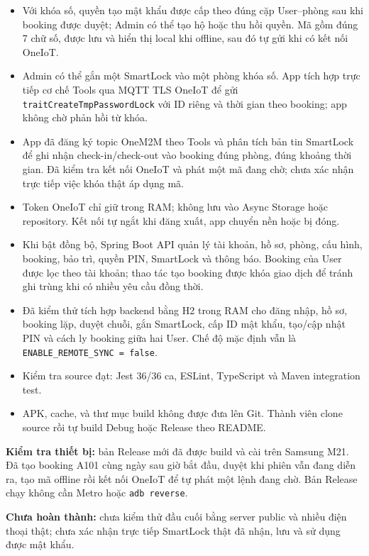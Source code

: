 \documentclass[12pt,a4paper]{article}
\begin{document}
\begin{itemize}[leftmargin=1.6em,itemsep=2pt,topsep=2pt]
  \item Với khóa số, quyền tạo mật khẩu được cấp theo đúng cặp User--phòng sau khi booking được duyệt; Admin có thể tạo hộ hoặc thu hồi quyền. Mã gồm đúng 7 chữ số, được lưu và hiển thị local khi offline, sau đó tự gửi khi có kết nối OneIoT.
  \item Admin có thể gắn một SmartLock vào một phòng khóa số. App tích hợp trực tiếp cơ chế Tools qua MQTT TLS OneIoT để gửi \texttt{traitCreateTmpPasswordLock} với ID riêng và thời gian theo booking; app không chờ phản hồi từ khóa.
  \item App đã đăng ký topic OneM2M theo Tools và phân tích bản tin SmartLock để ghi nhận check-in/check-out vào booking đúng phòng, đúng khoảng thời gian. Đã kiểm tra kết nối OneIoT và phát một mã đang chờ; chưa xác nhận trực tiếp việc khóa thật áp dụng mã.
  \item Token OneIoT chỉ giữ trong RAM; không lưu vào Async Storage hoặc repository. Kết nối tự ngắt khi đăng xuất, app chuyển nền hoặc bị đóng.
  \item Khi bật đồng bộ, Spring Boot API quản lý tài khoản, hồ sơ, phòng, cấu hình, booking, bảo trì, quyền PIN, SmartLock và thông báo. Booking của User được lọc theo tài khoản; thao tác tạo booking được khóa giao dịch để tránh ghi trùng khi có nhiều yêu cầu đồng thời.
  \item Đã kiểm thử tích hợp backend bằng H2 trong RAM cho đăng nhập, hồ sơ, booking lặp, duyệt chuỗi, gắn SmartLock, cấp ID mật khẩu, tạo/cập nhật PIN và cách ly booking giữa hai User. Chế độ mặc định vẫn là \texttt{ENABLE\_REMOTE\_SYNC = false}.
  \item Kiểm tra source đạt: Jest 36/36 ca, ESLint, TypeScript và Maven integration test.
  \item APK, cache,  và thư mục build không được đưa lên Git. Thành viên clone source rồi tự build Debug hoặc Release theo README.
\end{itemize}

\textbf{Kiểm tra thiết bị:} bản Release mới đã được build và cài trên Samsung M21. Đã tạo booking A101 cùng ngày sau giờ bắt đầu, duyệt khi phiên vẫn đang diễn ra, tạo mã offline rồi kết nối OneIoT để tự phát một lệnh đang chờ. Bản Release chạy không cần Metro hoặc \texttt{adb reverse}.

\textbf{Chưa hoàn thành:} chưa kiểm thử đầu cuối bằng server public và nhiều điện thoại thật; chưa xác nhận trực tiếp SmartLock thật đã nhận, lưu và sử dụng được mật khẩu.
\end{document}
